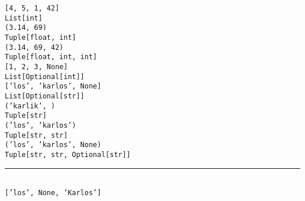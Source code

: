 \documentclass[12pt,a4paper]{article}
\begin{document}
\pagestyle{empty}

\setlength\parindent{0pt}
\setlength{\columnsep}{60pt}
\begin{multicols}{2}

\Large

\texttt{[4, 5, 1, 42]}\\

\texttt{List[int]}\\

\texttt{(3.14, 69)}\\

\texttt{Tuple[float, int]}\\

\texttt{(3.14, 69, 42)}\\

\texttt{Tuple[float, int, int]}\\

\texttt{[1, 2, 3, None]}\\

\texttt{List[Optional[int]]}\\

\texttt{['los', 'karlos', None]}\\

\texttt{List[Optional[str]]}\\

\texttt{('karlik', )}\\

\texttt{Tuple[str]}\\

\texttt{('los', 'karlos')}\\

\texttt{Tuple[str, str]}\\

\texttt{('los', 'karlos', None)}\\

\texttt{Tuple[str, str, Optional[str]]}\\

\noindent\rule{\linewidth}{1pt}
 \\
\texttt{['los', None, 'Karlos']}\\

\end{multicols}
\end{document}

